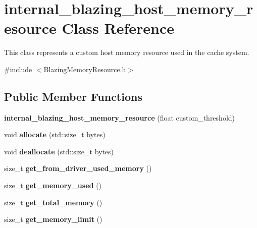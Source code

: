 \hypertarget{classinternal__blazing__host__memory__resource}{}\section{internal\+\_\+blazing\+\_\+host\+\_\+memory\+\_\+resource Class Reference}
\label{classinternal__blazing__host__memory__resource}


This class represents a custom host memory resource used in the cache system.  




{\ttfamily \#include $<$Blazing\+Memory\+Resource.\+h$>$}

\subsection*{Public Member Functions}
\begin{DoxyCompactItemize}
\item 
\mbox{\label{classinternal__blazing__host__memory__resource_abbca9320ecef415e869bbdc24636ad3a}} 
{\bfseries internal\+\_\+blazing\+\_\+host\+\_\+memory\+\_\+resource} (float custom\+\_\+threshold)
\item 
\mbox{\label{classinternal__blazing__host__memory__resource_afc8bcff78a92f57cbda62da0852709d8}} 
void {\bfseries allocate} (std\+::size\+\_\+t bytes)
\item 
\mbox{\label{classinternal__blazing__host__memory__resource_a41519b89b20b0a85bfb1ba0c73a7b14b}} 
void {\bfseries deallocate} (std\+::size\+\_\+t bytes)
\item 
\mbox{\label{classinternal__blazing__host__memory__resource_a9c5f77b9aca90263639661fd386e1b6e}} 
size\+\_\+t {\bfseries get\+\_\+from\+\_\+driver\+\_\+used\+\_\+memory} ()
\item 
\mbox{\label{classinternal__blazing__host__memory__resource_ad9813f47ca0ab5012e3b09253296758c}} 
size\+\_\+t {\bfseries get\+\_\+memory\+\_\+used} ()
\item 
\mbox{\label{classinternal__blazing__host__memory__resource_a0f33381b5e7eb7969daac769f60a0dbf}} 
size\+\_\+t {\bfseries get\+\_\+total\+\_\+memory} ()
\item 
\mbox{\label{classinternal__blazing__host__memory__resource_a75df32272daa359ee08395e943a2838c}} 
size\+\_\+t {\bfseries get\+\_\+memory\+\_\+limit} ()
\end{DoxyCompactItemize}


